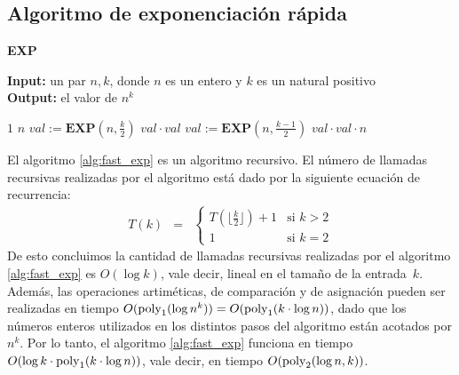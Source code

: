 \subsection{Algoritmo de exponenciación rápida}
\label{app-fast_exp}
\begin{algorithm}[H]
\caption{\quad\textbf{EXP}}
\label{alg:fast_exp}
\hspace*{\algorithmicindent} \textbf{Input:} un par $n, k$, donde $n$ es un entero y $k$ es un natural positivo\\
\hspace*{\algorithmicindent} \textbf{Output:} el valor de $n^k$
\begin{algorithmic}[1]
		\RETURN $1$
       \RETURN $n$
       \STATE $val :=\textbf{EXP}(n,\frac{k}{2})$
       \RETURN $val\cdot val$
    \ELSE
   	   \STATE $val :=\textbf{EXP}(n,\frac{k-1}{2})$
	   \RETURN $val\cdot val\cdot n$   
	   \ENDIF         
\end{algorithmic}
\end{algorithm}
El algoritmo \ref{alg:fast_exp} es un algoritmo recursivo. El número de llamadas recursivas realizadas por el algoritmo 
está dado por la siguiente ecuación de recurrencia:
\begin{eqnarray*}
	T(k) &=& 
	\begin{cases}
	T(\lfloor\frac{k}{2}\rfloor) + 1& \text{si } k > 2\\
	1 & \text{si } k = 2 
	\end{cases}
\end{eqnarray*}
De esto concluimos la cantidad de llamadas recursivas realizadas por el algoritmo \ref{alg:fast_exp} es $O(\log k)$, vale decir, lineal en el tamaño de la entrada~$k$. Además, las operaciones artiméticas, de comparación y de asignación pueden ser realizadas en tiempo $O({\rm poly}_1(\log n^k)) = O({\rm poly}_1(k \cdot \log n))$, dado que los números enteros utilizados en los distintos pasos del algoritmo están acotados por $n^k$. Por lo tanto, el algoritmo \ref{alg:fast_exp} funciona en tiempo $O(\log k \cdot {\rm poly}_1(k \cdot \log n))$, vale decir, en tiempo $O({\rm poly}_2(\log n,k))$. 
	
